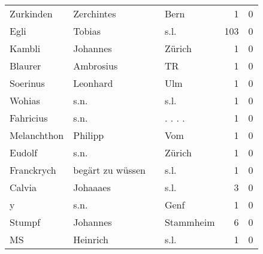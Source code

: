 \begin{tabular}{llllrr}
                Zurkinden &                         Zerchintes &             &                                        Bern &          1 &         0 \\
                     Egli &                             Tobias &             &                                        s.l. &        103 &         0 \\
                   Kambli &                           Johannes &             &                                      Zürich &          1 &         0 \\
                  Blaurer &                          Ambrosius &             &                                          TR &          1 &         0 \\
                 Soerinus &                           Leonhard &             &                                         Ulm &          1 &         0 \\
                   Wohias &                               s.n. &             &                                        s.l. &          1 &         0 \\
                Fahricius &                               s.n. &             &                                    . . . .  &          1 &         0 \\
              Melanchthon &                            Philipp &             &                                         Vom &          1 &         0 \\
                   Eudolf &                               s.n. &             &                                      Zürich &          1 &         0 \\
               Franckrych &                   begärt zu wüssen &             &                                        s.l. &          1 &         0 \\
                   Calvia &                           Johaaaes &             &                                        s.l. &          3 &         0 \\
                        y &                               s.n. &             &                                        Genf &          1 &         0 \\
                   Stumpf &                           Johannes &             &                                   Stammheim &          6 &         0 \\
                       MS &                           Heinrich &             &                                        s.l. &          1 &         0 \\

\end{tabular}
